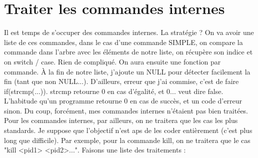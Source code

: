 \chapter[Commandes internes]{Traiter les commandes internes}
Il est temps de s'occuper des commandes internes. La stratégie ? On va avoir une liste de ces commandes, dans le cas d'une commande SIMPLE, on compare la commande dans l'arbre avec les éléments de notre liste, on récupère son indice et on switch / case. Rien de compliqué. On aura ensuite une fonction par commande. À la fin de notre liste, j'ajoute un NULL pour détecter facilement la fin (tant que non NULL...). D'ailleurs, erreur que j'ai commise, c'est de faire if(strcmp(...)). strcmp retourne 0 en cas d'égalité, et 0... veut dire false. L'habitude qu'un programme retourne 0 en cas de succès, et un code d'erreur sinon. Du coup, forcément, mes commandes internes n'étaient pas bien traitées. Pour les commandes internes, par ailleurs, on ne traitera que les cas les plus standards. Je suppose que l'objectif n'est aps de les coder entièrement (c'est plus long que difficile). Par exemple, pour la commande kill, on ne traitera que le cas "kill <pid1> <pid2>...". Faisons une liste des traitements :
